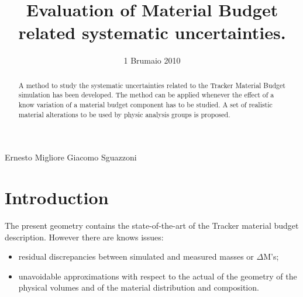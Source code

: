 \documentclass{cmspaper}
\begin{document}
\def \mrad      {{\rm \, mrad}}
\newcommand {\cm}         {\rm   cm}
\newcommand {\kg}         {\rm   kg}
\newcommand {\mm}         {\rm   mm}
\newcommand {\m}          {\rm   m}
\newcommand {\DM}         {\Delta {\mathrm M}}
\newcommand {\Xo}         {{\mathrm{X}_0}}
\newcommand {\TX}         {{\mathrm{T}_0}}
\newcommand {\tX}         {{\mathrm{t}_0}}
\newcommand {\lI}         {{\lambda_\mathrm{I}}}
\newcommand {\TI}         {{\mathrm{T}_\mathrm{I}}}
\newcommand {\tI}         {{\mathrm{t}_\mathrm{I}}}
\newcommand {\kvect}      {{\vec{k}}}

\renewcommand{\labelenumi}{\alph{enumi})}
\newcommand{\fixme}{{\bf FIXME~}}





\begin{titlepage}

   \date{1 Brumaio 2010}

  \title{Evaluation of Material Budget related systematic uncertainties.}

  \begin{Authlist}
    Ernesto Migliore
    Giacomo Sguazzoni
  \end{Authlist}

 
  \begin{abstract}
A method to study the systematic uncertainties related to the Tracker Material Budget simulation has been developed.
The method can be applied whenever the effect of a know variation of a material budget component has to be studied.
A set of realistic material alterations to be used by physic analysis groups is proposed.
  \end{abstract} 

\end{titlepage}

\setcounter{page}{2}%

\section{Introduction}

The present geometry contains the state-of-the-art of the Tracker material budget description. However there are knows issues:
\begin{itemize}
\item residual discrepancies between simulated and measured masses or $\DM$'s; 
\item unavoidable approximations with respect to the actual of the geometry of the physical volumes and of the material distribution and composition.
\end{itemize}
\end{document}
